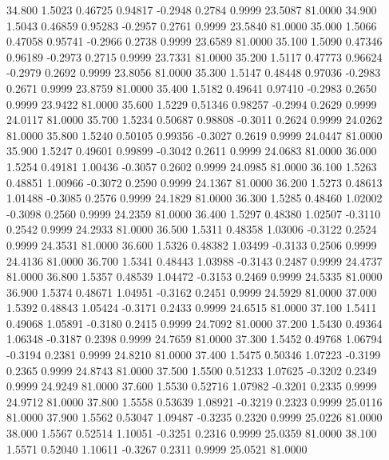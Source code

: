   34.800   1.5023   0.46725   0.94817  -0.2948   0.2784   0.9999  23.5087  81.0000
  34.900   1.5043   0.46859   0.95283  -0.2957   0.2761   0.9999  23.5840  81.0000
  35.000   1.5066   0.47058   0.95741  -0.2966   0.2738   0.9999  23.6589  81.0000
  35.100   1.5090   0.47346   0.96189  -0.2973   0.2715   0.9999  23.7331  81.0000
  35.200   1.5117   0.47773   0.96624  -0.2979   0.2692   0.9999  23.8056  81.0000
  35.300   1.5147   0.48448   0.97036  -0.2983   0.2671   0.9999  23.8759  81.0000
  35.400   1.5182   0.49641   0.97410  -0.2983   0.2650   0.9999  23.9422  81.0000
  35.600   1.5229   0.51346   0.98257  -0.2994   0.2629   0.9999  24.0117  81.0000
  35.700   1.5234   0.50687   0.98808  -0.3011   0.2624   0.9999  24.0262  81.0000
  35.800   1.5240   0.50105   0.99356  -0.3027   0.2619   0.9999  24.0447  81.0000
  35.900   1.5247   0.49601   0.99899  -0.3042   0.2611   0.9999  24.0683  81.0000
  36.000   1.5254   0.49181   1.00436  -0.3057   0.2602   0.9999  24.0985  81.0000
  36.100   1.5263   0.48851   1.00966  -0.3072   0.2590   0.9999  24.1367  81.0000
  36.200   1.5273   0.48613   1.01488  -0.3085   0.2576   0.9999  24.1829  81.0000
  36.300   1.5285   0.48460   1.02002  -0.3098   0.2560   0.9999  24.2359  81.0000
  36.400   1.5297   0.48380   1.02507  -0.3110   0.2542   0.9999  24.2933  81.0000
  36.500   1.5311   0.48358   1.03006  -0.3122   0.2524   0.9999  24.3531  81.0000
  36.600   1.5326   0.48382   1.03499  -0.3133   0.2506   0.9999  24.4136  81.0000
  36.700   1.5341   0.48443   1.03988  -0.3143   0.2487   0.9999  24.4737  81.0000
  36.800   1.5357   0.48539   1.04472  -0.3153   0.2469   0.9999  24.5335  81.0000
  36.900   1.5374   0.48671   1.04951  -0.3162   0.2451   0.9999  24.5929  81.0000
  37.000   1.5392   0.48843   1.05424  -0.3171   0.2433   0.9999  24.6515  81.0000
  37.100   1.5411   0.49068   1.05891  -0.3180   0.2415   0.9999  24.7092  81.0000
  37.200   1.5430   0.49364   1.06348  -0.3187   0.2398   0.9999  24.7659  81.0000
  37.300   1.5452   0.49768   1.06794  -0.3194   0.2381   0.9999  24.8210  81.0000
  37.400   1.5475   0.50346   1.07223  -0.3199   0.2365   0.9999  24.8743  81.0000
  37.500   1.5500   0.51233   1.07625  -0.3202   0.2349   0.9999  24.9249  81.0000
  37.600   1.5530   0.52716   1.07982  -0.3201   0.2335   0.9999  24.9712  81.0000
  37.800   1.5558   0.53639   1.08921  -0.3219   0.2323   0.9999  25.0116  81.0000
  37.900   1.5562   0.53047   1.09487  -0.3235   0.2320   0.9999  25.0226  81.0000
  38.000   1.5567   0.52514   1.10051  -0.3251   0.2316   0.9999  25.0359  81.0000
  38.100   1.5571   0.52040   1.10611  -0.3267   0.2311   0.9999  25.0521  81.0000
